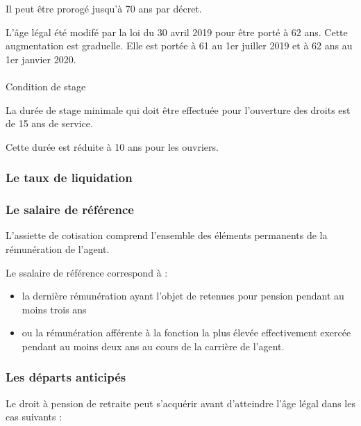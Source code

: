\documentclass[
  letterpaper,
  DIV=11,
  numbers=noendperiod]{scrreprt}
\makeatletter
\let\oldparagraph\paragraph
\renewcommand{\paragraph}{
    \@ifstar
      \xxxParagraphStar
      \xxxParagraphNoStar
  }
\newcommand{\xxxParagraphStar}[1]{\oldparagraph*{#1}\mbox{}}
\newcommand{\xxxParagraphNoStar}[1]{\oldparagraph{#1}\mbox{}}
\providecommand{\tightlist}{%
  \setlength{\itemsep}{0pt}\setlength{\parskip}{0pt}}\usepackage{longtable,booktabs,array}
\makeatother
\begin{document}
Il peut être prorogé jusqu'à 70 ans par décret.

L'âge légal été modifé par la loi du 30 avril 2019 pour être porté à 62
ans. Cette augmentation est graduelle. Elle est portée à 61 au 1er
juiller 2019 et à 62 ans au 1er janvier 2020.

\paragraph{Condition de stage}\label{condition-de-stage}

La durée de stage minimale qui doit être effectuée pour l'ouverture des
droits est de 15 ans de service.

Cette durée est réduite à 10 ans pour les ouvriers.

\subsubsection{Le taux de liquidation}\label{le-taux-de-liquidation}

\subsubsection{Le salaire de
référence}\label{le-salaire-de-ruxe9fuxe9rence}

L'assiette de cotisation comprend l'ensemble des éléments permanents de
la rémunération de l'agent.

Le ssalaire de référence correspond à :

\begin{itemize}
\tightlist
\item
  la dernière rémunération ayant l'objet de retenues pour pension
  pendant au moins trois ans
\item
  ou la rémunération afférente à la fonction la plus élevée
  effectivement exercée pendant au moins deux ans au cours de la
  carrière de l'agent.
\end{itemize}

\subsubsection{Les départs anticipés}\label{les-duxe9parts-anticipuxe9s}

Le droit à pension de retraite peut s'acquérir avant d'atteindre l'âge
légal dans les cas suivants :
\end{document}
